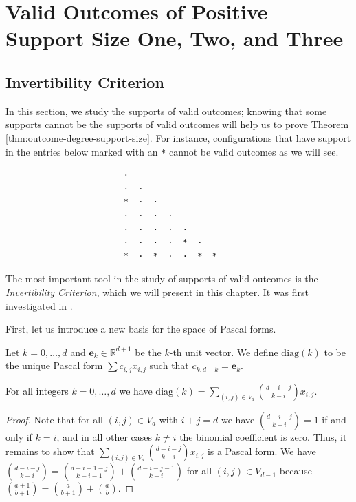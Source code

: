 \chapter{Valid Outcomes of Positive Support Size One, Two, and Three}

\section{Invertibility Criterion}

In this section, we study the supports of valid outcomes; knowing that some supports cannot be the supports of valid outcomes will help us to prove Theorem \ref{thm:outcome-degree-support-size}. For instance, configurations that have support in the entries below marked with an \texttt{*} cannot be valid outcomes as we will see.
\begin{verbatim}
                        ·  
                        ·  · 
                        *  ·  · 
                        ·  ·  ·  · 
                        ·  ·  ·  ·  · 
                        ·  ·  ·  ·  *  · 
                        *  ·  *  ·  ·  *  *
\end{verbatim}
The most important tool in the study of supports of valid outcomes is the \emph{Invertibility Criterion}, which we will present in this chapter. It was first investigated in \cite{bik2022classifying}. 

First, let us introduce a new basis for the space of Pascal forms.

\begin{definition}
    Let \( k = 0, \dots, d \) and \( \mathbf e_k \in \mathbb{R}^{d+1} \) be the \( k \)-th unit vector. We define \( \mathrm{diag}(k) \) to be the unique Pascal form \( \sum c_{i,j}x_{i,j} \) such that \( c_{k,d-k} = \mathbf e_k \).
\end{definition}

\begin{proposition}\label{prop:diagonal-basis-324324324231}
    For all integers \( k = 0, \dots, d \) we have \( \mathrm{diag}(k)  = \sum_{(i,j) \in V_d}\binom{d - i - j}{k-i} x_{i,j} \).
\end{proposition}



\begin{proof}
    Note that for all \( (i,j) \in V_d \) with \( i+j = d \) we have \( \binom{d - i - j}{k-i} = 1 \) if and only if \( k= i \), and in all other cases \( k \neq i \) the binomial coefficient is zero. Thus, it remains to show that \( \sum_{(i,j) \in V_d}\binom{d - i - j}{k-i} x_{i,j} \) is a Pascal form. We have \(  \binom{d-i-j}{k-i} = \binom{d-i-1-j}{k-i-1} + \binom{d-i-j-1}{k-i} \)
    for all \( (i,j) \in V_{d-1} \) because \( \binom{a+1}{b+1} = \binom{a}{b+1} + \binom{a}{b}\).
\end{proof}

